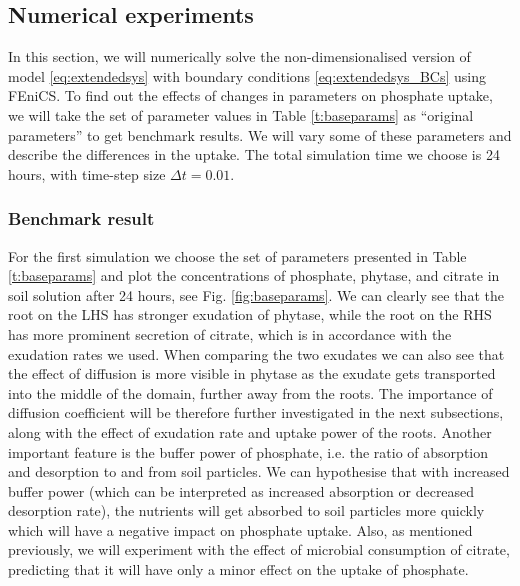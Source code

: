 \documentclass[11pt]{article}
\numberwithin{equation}{section}
\begin{document}
\subsection{Numerical experiments}
In this section, we will numerically solve the non-dimensionalised version of model \eqref{eq:extendedsys} with boundary conditions \eqref{eq:extendedsys_BCs} using FEniCS. To find out the effects of changes in parameters on phosphate uptake, we will take the set of parameter values in Table \ref{t:baseparams} as ``original parameters'' to get benchmark results. We will vary some of these parameters and describe the differences in the uptake. The total simulation time we choose is 24 hours, with time-step size $\Delta t = 0.01$.

\subsubsection{Benchmark result}
\label{sec:baseparams}
 For the first simulation we choose the set of parameters presented in Table \ref{t:baseparams} and plot the concentrations of phosphate, phytase, and citrate in soil solution after 24 hours, see Fig. \ref{fig:baseparams}. We can clearly see that the root on the LHS has stronger exudation of phytase, while the root on the RHS has more prominent secretion of citrate, which is in accordance with the exudation rates we used. When comparing the two exudates we can also see that the effect of diffusion is more visible in phytase as the exudate gets transported into the middle of the domain, further away from the roots. The importance of diffusion coefficient will be therefore further investigated in the next subsections, along with the effect of exudation rate and uptake power of the roots. Another important feature is the buffer power of phosphate, i.e. the ratio of absorption and desorption to and from soil particles. We can hypothesise that with increased buffer power (which can be interpreted as increased absorption or decreased desorption rate), the nutrients will get absorbed to soil particles more quickly which will have a negative impact on phosphate uptake. Also, as mentioned previously, we will experiment with the effect of microbial consumption of citrate, predicting that it will have only a minor effect on the uptake of phosphate.
\end{document}
